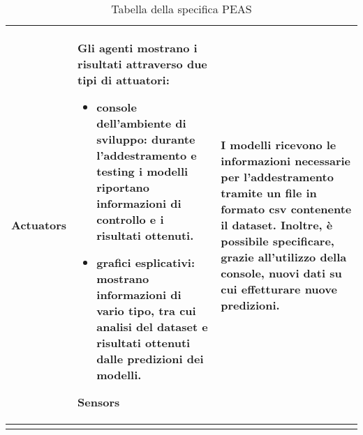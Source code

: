 \documentclass[12pt,oneside]{article}
\begin{document}
\begin{enumerate}
\begin{longtable}{ | p{3cm} | p{11cm} | }
    \hline
    \textbf{Actuators} & Gli agenti mostrano i risultati attraverso due tipi di attuatori: \begin{itemize}
    \item console dell'ambiente di sviluppo: durante l'addestramento e testing i modelli riportano informazioni di controllo e i risultati ottenuti.
    \item grafici esplicativi: mostrano informazioni di vario tipo, tra cui analisi del dataset e risultati ottenuti dalle predizioni dei modelli.\end{itemize}
    \hline
    \textbf{Sensors} & I modelli ricevono le informazioni necessarie per l'addestramento tramite un file in formato csv contenente il dataset. Inoltre, è possibile specificare, grazie all'utilizzo della console, nuovi dati su cui effetturare nuove predizioni. \\
    \hline
    \caption{Tabella della specifica PEAS}
    \end{longtable}
\label{table:ta}
\end{enumerate}
\end{document}
